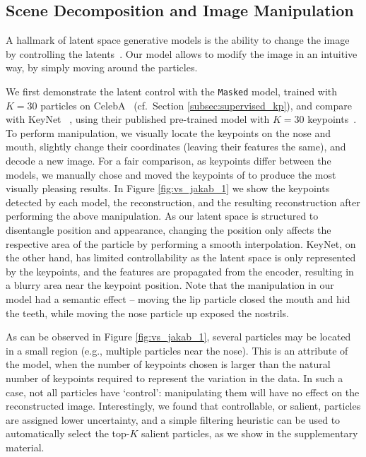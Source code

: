 \documentclass[nohyperref]{article}
\theoremstyle{plain}
\theoremstyle{definition}
\theoremstyle{remark}
\begin{document}
\subsection{Scene Decomposition and Image Manipulation}
\label{subsec:manip}
A hallmark of latent space generative models is the ability to change the image by controlling the latents~\citep{daniel2020soft, karras2020analyzing}.
Our model allows to modify the image in an intuitive way, by simply moving around the particles.


We first demonstrate the latent control with the \texttt{Masked} model,  trained with $K=30$ particles on CelebA~\citep{liu2015faceattributes} (cf.~Section \ref{subsec:supervised_kp}), and compare with KeyNet ~\citep{jakab2018unsupervised}, using their published pre-trained model with $K=30$ keypoints~\citep{keynet18code}. 
To perform manipulation, we visually locate the keypoints on the nose and mouth, slightly change their coordinates (leaving their features the same), and decode a new image. For a fair comparison, as keypoints differ between the models, we manually chose and moved the keypoints of \citet{jakab2018unsupervised} to produce the most visually pleasing results. 
In Figure \ref{fig:vs_jakab_1} we show the keypoints detected by each model, the reconstruction, and the resulting reconstruction after performing the above manipulation. As our latent space is structured to disentangle position and appearance, changing the position only affects the respective area of the particle by performing a smooth interpolation. KeyNet, on the other hand, has limited controllability as the latent space is only represented by the keypoints, and the features are propagated from the encoder, resulting in a blurry area near the keypoint position. Note that the manipulation in our model had a semantic effect -- moving the lip particle closed the mouth and hid the teeth, while moving the nose particle up exposed the nostrils.

As can be observed in Figure \ref{fig:vs_jakab_1}, several particles may be located in a small region (e.g., multiple particles near the nose). This is an attribute of the model, when the number of keypoints chosen is larger than the natural number of keypoints required to represent the variation in the data.  In such a case, not all particles have `control': manipulating them will have no effect on the reconstructed image. Interestingly, we found that controllable, or salient, particles are assigned lower uncertainty, and a simple filtering heuristic can be used to automatically select the top-$K$ salient particles, as we show in the supplementary material.
\end{document}
